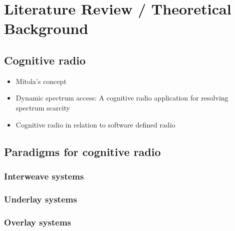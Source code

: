 \chapter{Literature Review / Theoretical Background}
\label{chap:wav}

\section{Cognitive radio}
\begin{itemize}
\item Mitola's concept
\item Dynamic spectrum access: A cognitive radio application for resolving spectrum scarcity
\item Cognitive radio in relation to software defined radio
\end{itemize}

\section{Paradigms for cognitive radio}
\subsection{Interweave systems}
\subsection{Underlay systems}
\subsection{Overlay systems}





